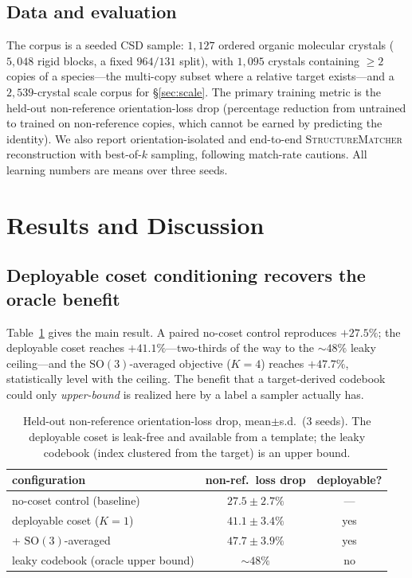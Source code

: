 \documentclass[journal=jcisd8,manuscript=article]{achemso}
\begin{document}
\subsection{Data and evaluation}\label{sec:data}
The corpus is a seeded CSD sample\cite{groom2016csd}: $1{,}127$ ordered organic
molecular crystals ($5{,}048$ rigid blocks, a fixed $964/131$ split), with
$1{,}095$ crystals containing $\ge2$ copies of a species---the multi-copy subset
where a relative target exists---and a $2{,}539$-crystal scale corpus for
\S\ref{sec:scale}. The primary training metric is the held-out non-reference
orientation-loss drop (percentage reduction from untrained to trained on
non-reference copies, which cannot be earned by predicting the identity). We also
report orientation-isolated and end-to-end \textsc{StructureMatcher}
reconstruction\cite{ong2013pymatgen} with best-of-$k$ sampling, following
match-rate cautions\cite{martirossyan2025matching}. All learning numbers are means
over three seeds.

\section{Results and Discussion}
\subsection{Deployable coset conditioning recovers the oracle benefit}
\label{sec:gate}
Table~\ref{tab:gate} gives the main result. A paired no-coset control reproduces
$+27.5\%$; the deployable coset reaches $+41.1\%$---two-thirds of the way to the
$\sim\!48\%$ leaky ceiling---and the $\mathrm{SO}(3)$-averaged objective ($K{=}4$)
reaches $+47.7\%$, statistically level with the ceiling. The benefit that a
target-derived codebook could only \emph{upper-bound} is realized here by a label a
sampler actually has.

\begin{table}[t]\centering
\caption{Held-out non-reference orientation-loss drop, mean$\pm$s.d.\ (3 seeds).
The deployable coset is leak-free and available from a template; the leaky codebook
(index clustered from the target) is an upper bound.}
\label{tab:gate}
\begin{tabular}{lcc}\toprule
configuration & non-ref.\ loss drop & deployable? \\\midrule
no-coset control (baseline)            & $27.5\pm2.7\%$ & --- \\
deployable coset ($K{=}1$)             & $41.1\pm3.4\%$ & yes \\
\quad + $\mathrm{SO}(3)$-averaged      & $47.7\pm3.9\%$ & yes \\
leaky codebook (oracle upper bound)    & $\sim48\%$      & no  \\\bottomrule
\end{tabular}
\end{table}
\end{document}
